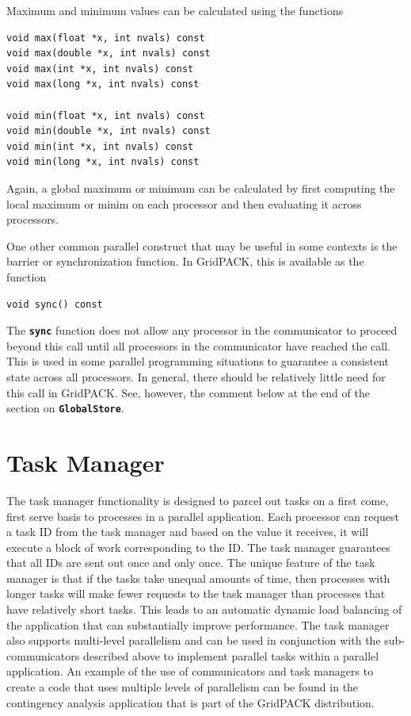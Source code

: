 \documentclass[12pt]{report} %
\begin{document}
Maximum and minimum values can be calculated using the functions

{
\color{red}
\begin{Verbatim}[fontseries=b]
void max(float *x, int nvals) const
void max(double *x, int nvals) const
void max(int *x, int nvals) const
void max(long *x, int nvals) const

void min(float *x, int nvals) const
void min(double *x, int nvals) const
void min(int *x, int nvals) const
void min(long *x, int nvals) const
\end{Verbatim}
}

Again, a global maximum or minimum can be calculated by first computing the local maximum or minim on each processor and then evaluating it across processors. 

One other common parallel construct that may be useful in some contexts is the barrier or synchronization function. In GridPACK, this is available as the function

{
\color{red}
\begin{Verbatim}[fontseries=b]
void sync() const
\end{Verbatim}
}

The \texttt{\textbf{sync}} function does not allow any processor in the communicator to proceed beyond this call until all processors in the communicator have reached the call. This is used in some parallel programming situations to guarantee a consistent state across all processors.  In general, there should be relatively little need for this call in GridPACK. See, however, the comment below at the end of the section on \texttt{\textbf{GlobalStore}}.

\section{Task Manager}

The task manager functionality is designed to parcel out tasks on a first come, first serve basis to processes in a parallel application. Each processor can request a task ID from the task manager and based on the value it receives, it will execute a block of work corresponding to the ID. The task manager guarantees that all IDs are sent out once and only once. The unique feature of the task manager is that if the tasks take unequal amounts of time, then processes with longer tasks will make fewer requests to the task manager than processes that have relatively short tasks. This leads to an automatic dynamic load balancing of the application that can substantially improve performance. The task manager also supports multi-level parallelism and can be used in conjunction with the sub-communicators described above to implement parallel tasks within a parallel application. An example of the use of communicators and task managers to create a code that uses multiple levels of parallelism can be found in the contingency analysis application that is part of the GridPACK distribution.
\end{document}
